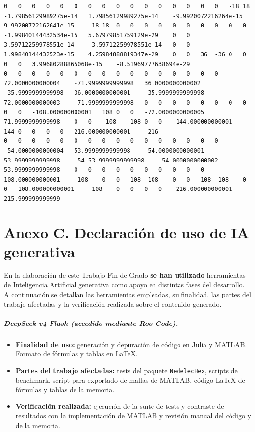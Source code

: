 \documentclass[12pt]{report} %
\begin{document}
\begin{landscape}
\begin{lstlisting}[numbers=none, basicstyle=\ttfamily\tiny, captionpos=b, caption={Matriz de coeficientes $W = G^{-1}$ ($54\times54$) calculada con MATLAB, sin redondear.}, label=cod:W-matlab]
0	0	0	0	0	0	0	0	0	0	0	0	0	0	0	0	-18	18	-1.79856129989275e-14	1.79856129989275e-14	-9.9920072216264e-15	9.99200722162641e-15	-18	18	0	0	0	0	0	0	0	0	0	0	-1.99840144432534e-15	5.67979851759129e-29	0	0	3.59712259978551e-14	-3.59712259978551e-14	0	0	1.99840144432523e-15	4.25984888819347e-29	0	0	36	-36	0	0	0	0	3.99680288865068e-15	-8.51969777638694e-29
0	0	0	0	0	0	0	0	0	0	0	0	0	0	0	0	72.0000000000004	-71.9999999999998	36.0000000000002	-35.9999999999998	36.0000000000001	-35.9999999999998	72.0000000000003	-71.9999999999998	0	0	0	0	0	0	0	0	0	0	-108.000000000001	108	0	0	-72.0000000000005	71.9999999999998	0	0	-108	108	0	0	-144.000000000001	144	0	0	0	0	216.000000000001	-216
0	0	0	0	0	0	0	0	0	0	0	0	0	0	0	0	-54.0000000000004	53.9999999999998	-54.0000000000001	53.9999999999998	-54	53.9999999999998	-54.0000000000002	53.9999999999998	0	0	0	0	0	0	0	0	0	0	108.000000000001	-108	0	0	108	-108	0	0	108	-108	0	0	108.000000000001	-108	0	0	0	0	-216.000000000001	215.999999999999
\end{lstlisting}
\end{landscape}

\clearpage
{}
\chapter*{Anexo C. Declaración de uso de IA generativa}


En la elaboración de este Trabajo Fin de Grado \textbf{se han utilizado} herramientas de Inteligencia Artificial generativa como apoyo en distintas fases del desarrollo. A continuación se detallan las herramientas empleadas, su finalidad, las partes del trabajo afectadas y la verificación realizada sobre el contenido generado.

\paragraph{DeepSeek v4 Flash (accedido mediante Roo Code).}
\begin{itemize}
	\item \textbf{Finalidad de uso:} generación y depuración de código en Julia y MATLAB. Formato de fórmulas y tablas en \LaTeX{}.
	\item \textbf{Partes del trabajo afectadas:} tests del paquete \texttt{NedelecHex}, scripts de benchmark, script para exportado de mallas de MATLAB, código \LaTeX{} de fórmulas y tablas de la memoria.
	\item \textbf{Verificación realizada:} ejecución de la suite de tests y contraste de resultados con la implementación de MATLAB y revisión manual del código y de la memoria.
\end{itemize}
\end{document}

